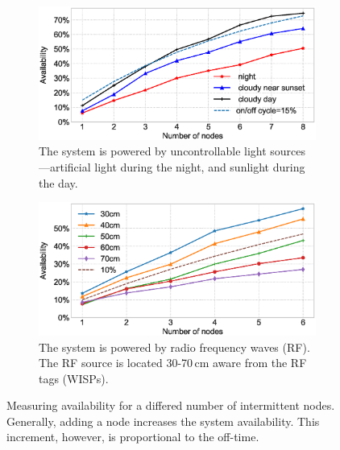 
\begin{figure}[t]
		\begin{subfigure}{\columnwidth}
			\centering
			\includegraphics[width=\textwidth]{figures/sysAvailability}
				\caption{The system is powered by uncontrollable light sources---artificial light during the night, and sunlight during the day.}
			\label{fig:solarPwrCIS}
		\end{subfigure}\hfill
		\begin{subfigure}{\columnwidth}
			\centering
			\includegraphics[width=\textwidth]{figures/wisp_sysAvailability}
				\caption{The system is powered by radio frequency waves (RF). The RF source is located 30-70\,cm aware from the RF tags (WISPs).}
			\label{fig:rfPwrCIS}
		\end{subfigure}
		\caption{Measuring \fullsys availability for a differed number of intermittent nodes. Generally, adding a node increases the system availability. This increment, however, is proportional to the \sys off-time.}
		\label{fig:pwrCIS}
\end{figure} 


